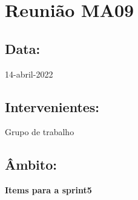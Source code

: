 \section{Reunião MA09}\label{reuniaoMA09}

\subsection*{Data:}
14-abril-2022

\subsection*{Intervenientes:}
Grupo de trabalho

\subsection*{Âmbito:}

\textbf{Items para a sprint5}

